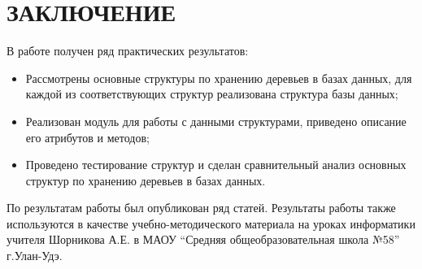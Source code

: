 \documentclass[a4paper,14pt]{extreport}
\theoremstyle{definition}
\begin{document}
\chapter*{ЗАКЛЮЧЕНИЕ}
В работе получен ряд практических результатов:
\begin{itemize}
\item	Рассмотрены основные структуры по хранению деревьев в базах данных, для каждой из соответствующих структур реализована структура базы данных;
\item	Реализован модуль для работы с данными структурами, приведено описание его атрибутов и методов;
\item	Проведено тестирование структур и сделан сравнительный анализ основных структур по хранению деревьев в базах данных.
\end{itemize}

По результатам работы был опубликован ряд статей\cite{Sayapin1,Sayapin2}. Результаты работы также используются в качестве учебно-методического материала на уроках информатики учителя Шорникова А.Е. в МАОУ “Средняя общеобразовательная школа №58” г.Улан-Удэ.
\end{document}
